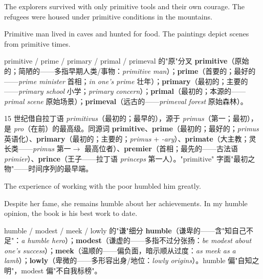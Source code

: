 \documentclass[../main.tex]{subfiles}
\begin{document}

{The explorers survived with only primitive tools and their own courage.}
{The refugees were housed under primitive conditions in the mountains.}

{Primitive man lived in caves and hunted for food.}
{The paintings depict scenes from primitive times.}

\begin{gram}{primitive / prime / primary / primal / primeval 的"原"分叉}
\textbf{primitive}（原始的；简陋的——多指早期人类/事物：\textit{primitive man}）；\textbf{prime}（首要的；最好的——\textit{prime minister} 首相；\textit{in one's prime} 壮年）；\textbf{primary}（最初的；主要的——\textit{primary school} 小学；\textit{primary concern}）；\textbf{primal}（最初的；本源的——\textit{primal scene} 原始场景）；\textbf{primeval}（远古的——\textit{primeval forest} 原始森林）。
\end{gram}

\begin{origin}
15 世纪借自拉丁语 \textit{primitivus}（最初的；最早的），源于 \textit{primus}（第一；最初），是 \textit{pro}（在前）的最高级。同源词 \textbf{primitive}、\textbf{prime}（最初的；最好的；\textit{primus} 英语化）、\textbf{primary}（最初的；主要的；\textit{primus} + \textit{-ary}）、\textbf{primate}（大主教；灵长类——\textit{primus} 第一$\to$ 最高位者）、\textbf{premier}（首相；最先的——古法语 \textit{primier}）、\textbf{prince}（王子——拉丁语 \textit{ princeps} 第一人）。"primitive" 字面"最初之物"——时间序列的最早端。
\end{origin}


{The experience of working with the poor humbled him greatly.}

{Despite her fame, she remains humble about her achievements.}
{In my humble opinion, the book is his best work to date.}

\begin{lex}{humble / modest / meek / lowly 的"谦"细分}
\textbf{humble}（谦卑的——含"知自己不足"：\textit{a humble hero}）；\textbf{modest}（谦虚的——多指不过分张扬：\textit{be modest about one's success}）；\textbf{meek}（温顺的——偏负面，暗示顺从过度：\textit{as meek as a lamb}）；\textbf{lowly}（卑微的——多形容出身/地位：\textit{lowly origins}）。humble 偏"自知之明"，modest 偏"不自我标榜"。
\end{lex}
\end{document}
